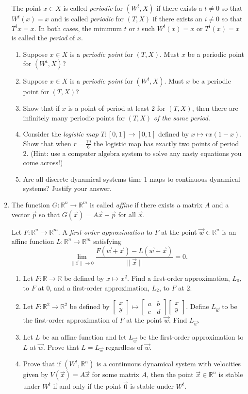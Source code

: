 \documentclass[letter]{article}
\newcommand{\R}{\mathbb{R}}
\newcommand{\mat}[1]{\begin{bmatrix}#1\end{bmatrix}}
\begin{document}
\begin{enumerate}
			The point $x\in X$ is called \emph{periodic} for $(W^t,X)$ if there exists a $t\neq 0$ so that $W^t(x)=x$ and
			is called \emph{periodic} for $(T,X)$ if there exists an $i\neq 0$ so that $T^ix=x$. In both cases, the minimum
			$t$ or $i$ such $W^t(x)=x$ or $T^i(x)=x$ is called the \emph{period} of $x$.
			\begin{enumerate}
				\item Suppose $x\in X$ is a \emph{periodic point} for $(T,X)$. Must $x$ be a periodic point for $(W^t,X)$?
				\item Suppose $x\in X$ is a \emph{periodic point} for $(W^t,X)$. Must $x$ be a periodic point for $(T,X)$?
				\item Show that if $x$ is a point of period at least $2$ for $(T,X)$, then there are infinitely many periodic
					points for $(T,X)$ \emph{of the same period}.
				\item Consider the \emph{logistic map} $T:[0,1]\to[0,1]$ defined by $x\mapsto rx(1-x)$. Show that
					when $r=\frac{19}{6}$ the logistic map has exactly two points of period 2. (Hint: use a computer
					algebra system to solve any nasty equations you come across!)
				\item Are all discrete dynamical systems time-$1$ maps to continuous dynamical systems? Justify your answer.
			\end{enumerate}

		\item The function $G:\R^n\to\R^m$ is called \emph{affine} if there exists a matrix $A$ and
			a vector $\vec p$ so that $G(\vec x) = A\vec x+\vec p$ for all $\vec x$.

			Let $F:\R^n\to\R^m$. A \emph{first-order approximation} to $F$ at the point $\vec w\in \R^n$ is an
			affine function $L:\R^n\to\R^m$ satisfying
			\[
				\lim_{\|\vec x\|\to 0} \frac{F(\vec w+\vec x)-L(\vec w+\vec x)}{\|\vec x\|} = 0.
			\]
			\begin{enumerate}
				\item Let $F:\R\to\R$ be defined by $x\mapsto x^2$. Find a first-order approximation, $L_0$, 
					to $F$ at $0$, and a first-order approximation, $L_2$, to $F$ at $2$.
				\item Let $F:\R^2\to\R^2$ be defined by $\mat{x\\y}\mapsto \mat{a&b\\c&d}\mat{x\\y}$. Define
					$L_{\vec w}$ to be the first-order approximation of $F$ at the point $\vec w$. Find $L_{\vec w}$.
				\item Let $L$ be an affine function and let $L_{\vec w}$ be the
					first-order approximation to $L$ at $\vec w$.
					Prove that $L=L_{\vec w}$ regardless of $\vec w$.
				\item Prove that if $(W^t,\R^n)$ is a continuous dynamical system with velocities given by
					$V(\vec x)=A\vec x$ for some matrix $A$, then the point $\vec x\in \R^n$ is stable under $W^t$
					if and only if the point $\vec 0$ is stable under $W^t$.


\end{enumerate}
\end{enumerate}
\end{document}
